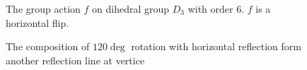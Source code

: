 \begin{figure}[ht]
    \centering
    \caption{The group action $f$ on dihedral group $D_3$ with order 6. $f$ is a horizontal flip.}
\end{figure}

\begin{figure}[ht]
    \centering
    \caption{The composition of $120\deg$ rotation with horizontal reflection form another reflection line at vertice}
\end{figure}

